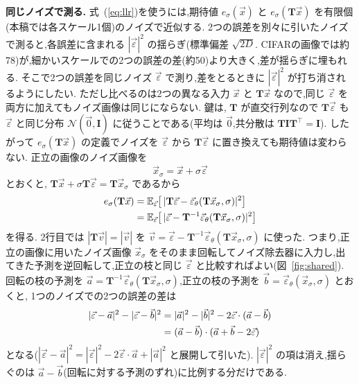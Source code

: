 \documentclass[MIRU,submit,onecolumn]{miru2025j}
\newcommand{\veps}{\vec{\varepsilon}}
\newcommand{\epsth}{\vec{\varepsilon}_\theta}
\newcommand{\E}{\mathbb{E}}
\newcommand{\mT}{\mathbf{T}}            %
\newcommand{\mI}{\mathbf{I}}
\renewcommand{\eqref}[1]{(\ref{#1})}   %
\begin{document}
\textbf{同じノイズで測る.}
式~\eqref{eq:llr}を使うには,期待値 $e_\sigma(\vec{x})$ と $e_\sigma(\mT\vec{x})$ を有限個(本稿では各スケール1個)のノイズで近似する. %
2つの誤差を別々に引いたノイズで測ると,各誤差に含まれる $|\veps|^2$ の揺らぎ(標準偏差 $\sqrt{2D}$. CIFARの画像では約78)が,細かいスケールでの2つの誤差の差(約50)より大きく,差が揺らぎに埋もれる. %
そこで2つの誤差を同じノイズ $\veps$ で測り,差をとるときに $|\veps|^2$ が打ち消されるようにしたい. %
ただし比べるのは2つの異なる入力 $\vec{x}$ と $\mT\vec{x}$ なので,同じ $\veps$ を両方に加えてもノイズ画像は同じにならない. %
鍵は, $\mT$ が直交行列なので $\mT\veps$ も $\veps$ と同じ分布 $\mathcal{N}(\vec{0},\mI)$ に従うことである(平均は $\vec{0}$,共分散は $\mT\mI\mT^{\top}=\mI$). %
したがって $e_\sigma(\mT\vec{x})$ の定義でノイズを $\veps$ から $\mT\veps$ に置き換えても期待値は変わらない. 正立の画像のノイズ画像を
\begin{equation}
\vec{x}_\sigma=\vec{x}+\sigma\veps
\label{eq:xs}
\end{equation}
とおくと, $\mT\vec{x}+\sigma\mT\veps=\mT\vec{x}_\sigma$ であるから
\begin{align}
e_\sigma(\mT\vec{x})&=\E_{\veps}\big[\,|\mT\veps-\epsth(\mT\vec{x}_\sigma,\sigma)|^2\big]\notag\\
&=\E_{\veps}\big[\,|\veps-\mT^{-1}\epsth(\mT\vec{x}_\sigma,\sigma)|^2\big]
\label{eq:shared}
\end{align}
を得る. 2行目では $|\mT\vec{v}|=|\vec{v}|$ を $\vec{v}=\veps-\mT^{-1}\epsth(\mT\vec{x}_\sigma,\sigma)$ に使った. %
つまり,正立の画像に用いたノイズ画像 $\vec{x}_\sigma$ をそのまま回転してノイズ除去器に入力し,出てきた予測を逆回転して,正立の枝と同じ $\veps$ と比較すればよい(図~\ref{fig:shared}). %
回転の枝の予測を $\vec{a}=\mT^{-1}\epsth(\mT\vec{x}_\sigma,\sigma)$,正立の枝の予測を $\vec{b}=\epsth(\vec{x}_\sigma,\sigma)$ とおくと, 1つのノイズでの2つの誤差の差は
\begin{align}
|\veps-\vec{a}|^2-|\veps-\vec{b}|^2&=|\vec{a}|^2-|\vec{b}|^2-2\veps\cdot(\vec{a}-\vec{b})\notag\\
&=(\vec{a}-\vec{b})\cdot(\vec{a}+\vec{b}-2\veps)
\label{eq:diff}
\end{align}
となる($|\veps-\vec{a}|^2=|\veps|^2-2\veps\cdot\vec{a}+|\vec{a}|^2$ と展開して引いた). %
$|\veps|^2$ の項は消え,揺らぐのは $\vec{a}-\vec{b}$(回転に対する予測のずれ)に比例する分だけである.
\end{document}
